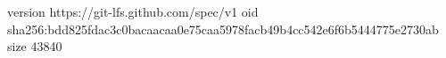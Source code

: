 version https://git-lfs.github.com/spec/v1
oid sha256:bdd825fdac3c0bacaacaa0e75caa5978facb49b4cc542e6f6b5444775e2730ab
size 43840
